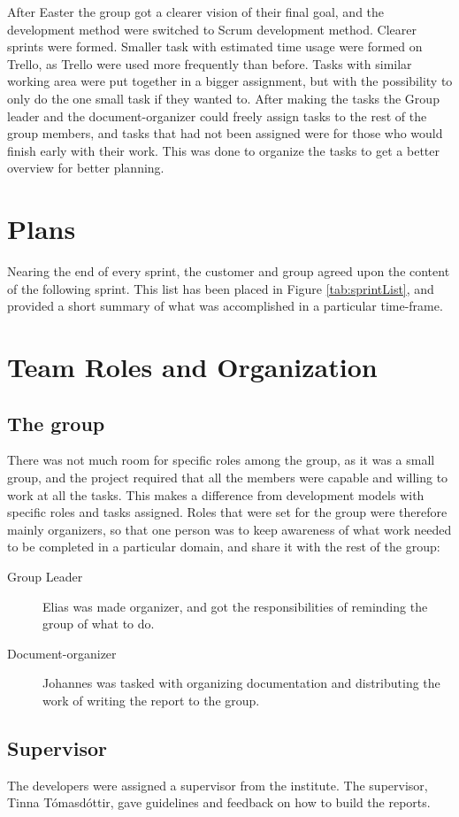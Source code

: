 After Easter the group got a clearer vision of their final goal, and the development method were switched to Scrum development method. Clearer sprints were formed. Smaller task with estimated time usage were formed on Trello, as Trello were used more frequently than before. Tasks with similar working area were put together in a bigger assignment, but with the possibility to only do the one small task if they wanted to. After making the tasks the Group leader and the document-organizer could freely assign tasks to the rest of the group members, and tasks that had not been assigned were for those who would finish early with their work. This was done to organize the tasks to get a better overview for better planning. 
%
\section{Plans}
Nearing the end of every sprint, the customer and group agreed upon the content of the following sprint. This list has been placed in Figure \ref{tab:sprintList}, and provided a short summary of what was accomplished in a particular time-frame. 
%
\section{Team Roles and Organization}
\subsection{The group}
There was not much room for specific roles among the group, as it was a small group, and the project required that all the members were capable and willing to work at all the tasks. This makes a difference from development models with specific roles and tasks assigned. Roles that were set for the group were therefore mainly organizers, so that one person was to keep awareness of what work needed to be completed in a particular domain, and share it with the rest of the group:
\begin{description}
\item[Group Leader] Elias was made organizer, and got the responsibilities of reminding the group of what to do.
\item[Document-organizer] Johannes was tasked with organizing documentation and distributing the work of writing the report to the group. 
\end{description}
%
\subsection{Supervisor}
The developers were assigned a supervisor from the institute. The supervisor, Tinna T\'{o}masd\'{o}ttir, gave guidelines and feedback on how to build the reports.
%

